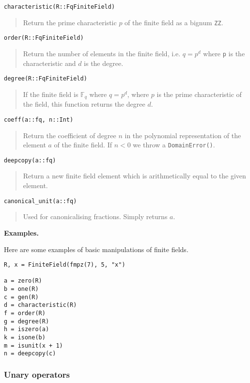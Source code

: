 \documentclass[a4paper,10pt]{article}
\newcommand{\F}{\mathbb{F}}
\newcommand{\code}{\lstinline}
\newcommand{\desc}[1]{\vspace{-3mm}\begin{quote}#1\end{quote}}
\begin{document}
{{\begin{lstlisting}
characteristic(R::FqFiniteField)
\end{lstlisting}

\desc{Return the prime characteristic $p$ of the finite field as a bignum
\code{ZZ}.}

\begin{lstlisting}
order(R::FqFiniteField)
\end{lstlisting}

\desc{Return the number of elements in the finite field, i.e. $q = p^d$
where \code{p} is the characteristic and $d$ is the degree.}

\begin{lstlisting}
degree(R::FqFiniteField)
\end{lstlisting}

\desc{If the finite field is $\F_q$ where $q = p^d$, where $p$ is the
prime characteristic of the field, this function returns the degree
$d$.}

\begin{lstlisting}
coeff(a::fq, n::Int)
\end{lstlisting}

\desc{Return the coefficient of degree $n$ in the polynomial representation
of the element $a$ of the finite field. If $n < 0$ we throw a
\code{DomainError()}.}

\begin{lstlisting}
deepcopy(a::fq)
\end{lstlisting}

\desc{Return a new finite field element which is arithmetically equal to
the given element.}

\begin{lstlisting}
canonical_unit(a::fq)
\end{lstlisting}

\desc{Used for canonicalising fractions. Simply returns $a$.}

\textbf{Examples.}

Here are some examples of basic manipulations of finite fields.

\begin{lstlisting}
R, x = FiniteField(fmpz(7), 5, "x")

a = zero(R)
b = one(R)
c = gen(R)
d = characteristic(R)
f = order(R)
g = degree(R)
h = iszero(a)
k = isone(b)
m = isunit(x + 1)
n = deepcopy(c)
\end{lstlisting}

\subsubsection{Unary operators}

}}
\end{document}
